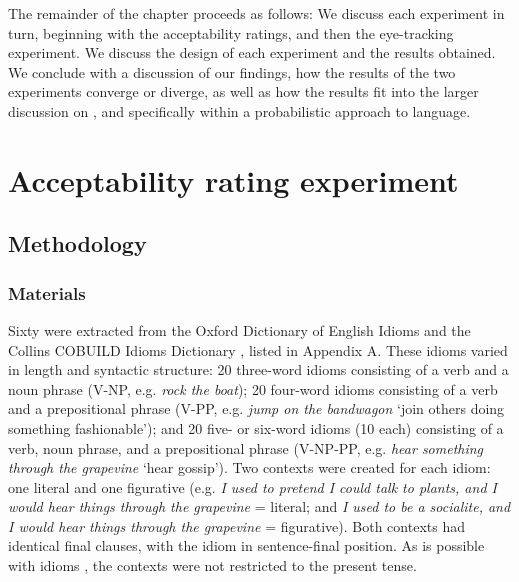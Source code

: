 \documentclass[output=paper
,modfonts
,nonflat]{langsci/langscibook}
\begin{document}
The remainder of the chapter proceeds as follows: We discuss each experiment in turn, beginning with the acceptability ratings, and then the eye-tracking experiment. We discuss the design of each experiment and the results obtained. We conclude with a discussion of our findings, how the results of the two experiments converge or diverge,  as well as how the results fit into the larger discussion on , and specifically within a probabilistic approach to language.




\section{Acceptability rating experiment}

\subsection{Methodology}
\subsubsection{Materials}

Sixty  were extracted from the Oxford Dictionary of English Idioms \citep{OxfordIdiomsDictionary} and the Collins COBUILD Idioms Dictionary \citep{CollinsIdiomsDictionary}, listed in Appendix A. These idioms varied in length and syntactic structure: 20 three-word idioms consisting of a verb and a noun phrase (V-NP, e.g. \textit{rock the boat}); 20 four-word idioms consisting of a verb and a prepositional phrase (V-PP, e.g. \textit{jump on the bandwagon} `join others doing something fashionable'); and 20 five- or six-word idioms (10 each) consisting of a verb, noun phrase, and a prepositional phrase (V-NP-PP, e.g. \textit{hear something through the grapevine} `hear gossip'). Two contexts were created for each idiom: one literal  and one figurative (e.g. \textit {I used to pretend I could talk to plants, and I would hear things through the grapevine} = literal; and \textit {I used to be a socialite, and I would hear things through the grapevine} = figurative). Both contexts had identical final clauses, with the idiom in sentence-final position. As  is possible with idioms \citep{Moon1998, Schroder2013}, the contexts were not restricted to the present tense.
\end{document}
